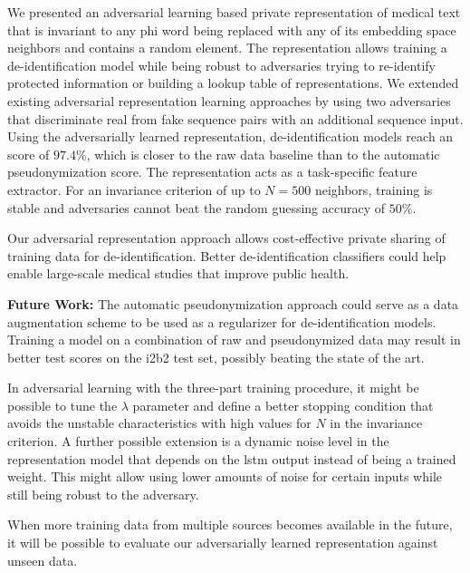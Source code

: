 %
We presented an adversarial learning based private representation of medical text that is invariant to any \ac{phi} word being replaced with any of its embedding space neighbors and contains a random element.
%
The representation allows training a de-identification model while being robust to adversaries trying to re-identify protected information or building a lookup table of representations.
%
We extended existing adversarial representation learning approaches by using two adversaries that discriminate real from fake sequence pairs with an additional sequence input.
%
Using the adversarially learned representation, de-identification models reach an \fone score of $97.4\%$, which is closer to the raw data baseline than to the automatic pseudonymization score.
%
The representation acts as a task-specific feature extractor.
%
For an invariance criterion of up to $N=500$ neighbors, training is stable and adversaries cannot beat the random guessing accuracy of $50\%$.

%
Our adversarial representation approach allows cost-effective private sharing of training data for de-identification.
%
Better de-identification classifiers could help enable large-scale medical studies that improve public health.

%
\textbf{Future Work:} The automatic pseudonymization approach could serve as a data augmentation scheme to be used as a regularizer for de-identification models.
%
Training a model on a combination of raw and pseudonymized data may result in better test scores on the i2b2 test set, possibly beating the state of the art.

%
In adversarial learning with the three-part training procedure, it might be possible to tune the $\lambda$ parameter and define a better stopping condition that avoids the unstable characteristics with high values for $N$ in the invariance criterion.
%
A further possible extension is a dynamic noise level in the representation model that depends on the \ac{lstm} output instead of being a trained weight.
%
This might allow using lower amounts of noise for certain inputs while still being robust to the adversary.


%
When more training data from multiple sources becomes available in the future, it will be possible to evaluate our adversarially learned representation against unseen data.

